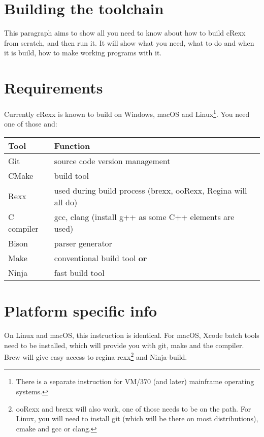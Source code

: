 \hypertarget{building-the-toolchain}{%
\section{\texorpdfstring{Building the \crexx{}
toolchain}{Building the  toolchain}}\label{building-the-toolchain}}

This paragraph aims to show all you need to know about how to build
cRexx from scratch, and then run it. It will show what you need, what to
do and when it is build, how to make working programs with it.

\hypertarget{requirements}{%
\section{Requirements}\label{requirements}}

Currently cRexx is known to build on Windows, macOS and
Linux\footnote{There is a separate instruction for VM/370 (and later)
  mainframe operating systems.}. You need one of those and:

\begin{longtable}[]{@{}ll@{}}
\toprule
Tool & Function \\
\midrule
\endhead
Git & source code version management \\
CMake & build tool \\
Rexx & used during build process (brexx, ooRexx, Regina will all do) \\
C compiler & gcc, clang (install g++ as some C++ elements are used) \\
Bison & parser generator \\
Make & conventional build tool \textbf{or} \\
Ninja & fast build tool \\
\bottomrule
\end{longtable}

\hypertarget{platform-specific-info}{%
\section{Platform specific info}\label{platform-specific-info}}

On Linux and macOS, this instruction is identical. For macOS, Xcode
batch tools need to be installed, which will provide you with git, make
and the compiler. Brew will give easy access to regina-rexx\footnote{ooRexx
  and brexx will also work, one of those needs to be on the path. For
  Linux, you will need to install git (which will be there on most
  distributions), cmake and gcc or clang.} and Ninja-build.

